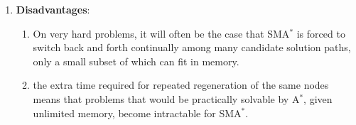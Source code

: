 \begin{enumerate}[itemsep=0.2cm]
    \item \textbf{Disadvantages}:
    \begin{enumerate}
        \item On very hard problems, it will often be the case that SMA$^\ast$ is forced to switch back and forth continually among many candidate solution paths, only a small subset of which can fit in memory.
        \hfill \cite{ai/book/Artificial-Intelligence-A-Modern-Approach/Russell-Norvig}

        \item the extra time required for repeated regeneration of the same nodes means that problems that would be practically solvable by A$^\ast$, given unlimited memory, become intractable for SMA$^\ast$.
        \hfill \cite{ai/book/Artificial-Intelligence-A-Modern-Approach/Russell-Norvig}
    \end{enumerate}
\end{enumerate}







